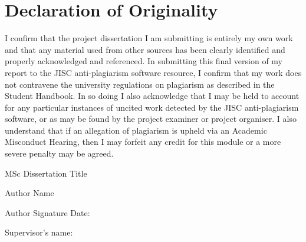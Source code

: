 \chapter*{Declaration of Originality}
I confirm that the project dissertation I am submitting is entirely my own work and that any material used from other sources has been clearly identified and properly acknowledged and referenced. In submitting this final version of my report to the JISC anti-plagiarism software resource, I confirm that my work does not contravene the university regulations on plagiarism as described in the Student Handbook. In so doing I also acknowledge that I may be held to account for any particular instances of uncited work detected by the JISC anti-plagiarism software, or as may be found by the project examiner or project organiser. I also understand that if an allegation of plagiarism is upheld via an Academic Misconduct Hearing, then I may forfeit any credit for this module or a more severe penalty may be agreed.


MSc Dissertation Title



Author Name



Author Signature		\hfill Date:



Supervisor’s name: 

